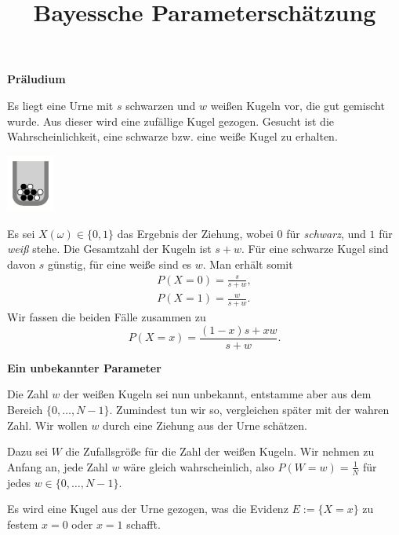 \documentclass[8pt]{beamer}
\title{Bayessche Parameterschätzung}
\date{}
\newcommand{\strong}[1]{\textsf{\textbf{#1}}}
\newcommand{\parspace}{\vspace{0.8em}}
\newcommand{\centerheadline}[1]{%
  \begin{center}\strong{#1}\end{center}}
\begin{document}
\begin{frame}
\maketitle
\end{frame}

\begin{frame}
\centerheadline{Präludium}
\end{frame}

\begin{frame}

\begin{minipage}{0.70\textwidth}
Es liegt eine Urne mit $s$ schwarzen und $w$ weißen Kugeln vor, die
gut gemischt wurde. Aus dieser wird eine zufällige Kugel gezogen.
Gesucht ist die Wahrscheinlichkeit, eine schwarze bzw. eine weiße Kugel
zu erhalten.
\end{minipage}
\qquad
\begin{minipage}{0.20\textwidth}
\includegraphics[width=16mm]{img/Urne.pdf}
\end{minipage}\pause

\parspace
Es sei $X(\omega)\in\{0,1\}$ das Ergebnis der Ziehung, wobei $0$ für
\emph{schwarz}, und $1$ für \emph{weiß} stehe. Die Gesamtzahl
der Kugeln ist $s+w$. Für eine schwarze Kugel sind davon $s$ günstig,
für eine weiße sind es $w$. Man erhält somit
\begin{align*}
P(X=0) = \frac{s}{s+w},\\
P(X=1) = \frac{w}{s+w}.
\end{align*}\pause
Wir fassen die beiden Fälle zusammen zu
\[P(X=x) = \frac{(1-x)s+xw}{s+w}.\]
\end{frame}

\begin{frame}
\centerheadline{Ein unbekannter Parameter}
\end{frame}

\begin{frame}
Die Zahl $w$ der weißen Kugeln sei nun unbekannt, entstamme aber aus
dem Bereich $\{0,\ldots,N-1\}$. Zumindest tun wir so, vergleichen
später mit der wahren Zahl. Wir wollen $w$ durch eine Ziehung aus der
Urne schätzen.\pause

\parspace
Dazu sei $W$ die Zufallsgröße für die Zahl der weißen Kugeln.
Wir nehmen zu Anfang an, jede Zahl $w$ wäre gleich wahrscheinlich, also
$P(W=w)=\frac{1}{N}$ für jedes $w\in\{0,\ldots,N-1\}$.\pause

\parspace
Es wird eine Kugel aus der Urne gezogen, was die Evidenz $E:=\{X=x\}$
zu festem $x=0$ oder $x=1$ schafft.
\end{frame}
\end{document}
